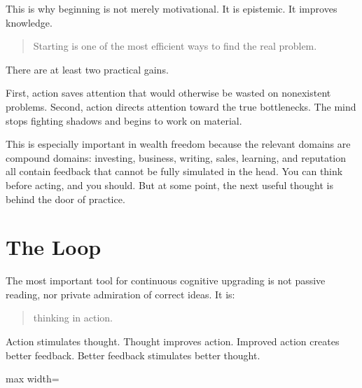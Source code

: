 This is why beginning is not merely motivational. It is epistemic. It improves knowledge.

\begin{quote}
Starting is one of the most efficient ways to find the real problem.
\end{quote}

There are at least two practical gains.

First, action saves attention that would otherwise be wasted on nonexistent problems. Second, action directs attention toward the true bottlenecks. The mind stops fighting shadows and begins to work on material.

This is especially important in wealth freedom because the relevant domains are compound domains: investing, business, writing, sales, learning, and reputation all contain feedback that cannot be fully simulated in the head. You can think before acting, and you should. But at some point, the next useful thought is behind the door of practice.

\section*{The Loop}

The most important tool for continuous cognitive upgrading is not passive reading, nor private admiration of correct ideas. It is:

\begin{quote}
thinking in action.
\end{quote}

Action stimulates thought. Thought improves action. Improved action creates better feedback. Better feedback stimulates better thought.

\begin{center}
\begin{adjustbox}{max width=\linewidth}
\end{adjustbox}
\end{center}

